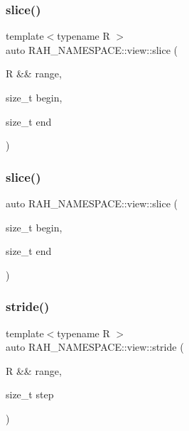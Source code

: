 \mbox{\label{namespace_r_a_h___n_a_m_e_s_p_a_c_e_1_1view_a75574da8231039293d2a8e1f38484d25}} 
\subsubsection{\texorpdfstring{slice()}{slice()}\hspace{0.1cm}{\footnotesize\ttfamily [1/2]}}
{\footnotesize\ttfamily template$<$typename R $>$ \\
auto R\+A\+H\+\_\+\+N\+A\+M\+E\+S\+P\+A\+C\+E\+::view\+::slice (\begin{DoxyParamCaption}\item[{R \&\&}]{range,  }\item[{size\+\_\+t}]{begin,  }\item[{size\+\_\+t}]{end }\end{DoxyParamCaption})}

\mbox{\label{namespace_r_a_h___n_a_m_e_s_p_a_c_e_1_1view_af14d4072d2e0799f4b4391307e086c0f}} 
\subsubsection{\texorpdfstring{slice()}{slice()}\hspace{0.1cm}{\footnotesize\ttfamily [2/2]}}
{\footnotesize\ttfamily auto R\+A\+H\+\_\+\+N\+A\+M\+E\+S\+P\+A\+C\+E\+::view\+::slice (\begin{DoxyParamCaption}\item[{size\+\_\+t}]{begin,  }\item[{size\+\_\+t}]{end }\end{DoxyParamCaption})}

\mbox{\label{namespace_r_a_h___n_a_m_e_s_p_a_c_e_1_1view_a510c62d1b397ade76b0fd5781d5b8448}} 
\subsubsection{\texorpdfstring{stride()}{stride()}\hspace{0.1cm}{\footnotesize\ttfamily [1/2]}}
{\footnotesize\ttfamily template$<$typename R $>$ \\
auto R\+A\+H\+\_\+\+N\+A\+M\+E\+S\+P\+A\+C\+E\+::view\+::stride (\begin{DoxyParamCaption}\item[{R \&\&}]{range,  }\item[{size\+\_\+t}]{step }\end{DoxyParamCaption})}

